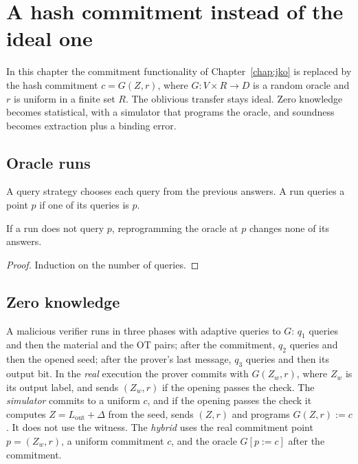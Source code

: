 \chapter{A hash commitment instead of the ideal one}
\label{chap:commitment}

In this chapter the commitment functionality of Chapter~\ref{chap:jko} is replaced by the hash
commitment $c = G(Z, r)$, where $G \colon V \times R \to D$ is a random oracle and $r$ is uniform in
a finite set $R$. The oblivious transfer stays ideal. Zero knowledge becomes statistical, with a
simulator that programs the oracle, and soundness becomes extraction plus a binding error.

\section{Oracle runs}

\begin{definition}[Runs]
  \label{def:ans}
  \leanok
  A query strategy chooses each query from the previous answers. A run queries a point $p$ if one
  of its queries is $p$.
\end{definition}

\begin{lemma}
  \label{lem:ans-update}
  \leanok
  If a run does not query $p$, reprogramming the oracle at $p$ changes none of its answers.
\end{lemma}

\begin{proof}
  \leanok
  Induction on the number of queries.
\end{proof}

\section{Zero knowledge}

\begin{definition}
  \label{def:com-games}
  \leanok
  A malicious verifier runs in three phases with adaptive queries to $G$: $q_1$ queries and then
  the material and the OT pairs; after the commitment, $q_2$ queries and then the opened seed;
  after the prover's last message, $q_3$ queries and then its output bit. In the \emph{real}
  execution the prover commits with $G(Z_w, r)$, where $Z_w$ is its output label, and sends
  $(Z_w, r)$ if the opening passes the check. The \emph{simulator} commits to a uniform $c$, and if
  the opening passes the check it computes $Z = L_{\mathrm{out}} + \Delta$ from the seed, sends
  $(Z, r)$ and programs $G(Z, r) := c$. It does not use the witness. The \emph{hybrid} uses the real
  commitment point $p = (Z_w, r)$, a uniform commitment $c$, and the oracle $G[p := c]$ after the
  commitment.
\end{definition}

